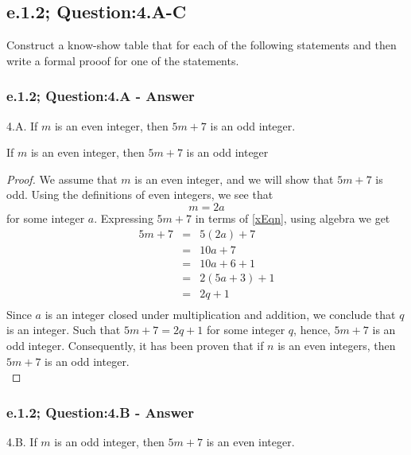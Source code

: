 \subsection{e.1.2; Question:4.A-C}
Construct a know-show table that for each of the following statements and then write a formal prooof for one of the statements. \\

\subsubsection*{e.1.2; Question:4.A - Answer}
4.A. If $m$ is an even integer, then $5m + 7$ is an odd integer. \\

\begin{tcolorbox}
\begin{theorem}
If $m$ is an even integer, then $5m + 7$ is an odd integer
\end{theorem}
\end{tcolorbox}

\begin{proof}
We assume that $m$ is an even integer, and we will show that $5m + 7$ is odd. Using the definitions of even integers, we see that
\begin{equation}
\label{xEqn}
m = 2a
\end{equation}
for some integer $a$. Expressing $5m + 7$ in terms of \ref{xEqn}, using algebra we get
\begin{eqnarray*}
5m + 7 & = & 5(2a) + 7  \nonumber \\
& = & 10a + 7 \nonumber \\
& = & 10a + 6 + 1 \nonumber \\
& = & 2(5a + 3) + 1 \nonumber \\
& = & 2q + 1 \nonumber \\
\end{eqnarray*}
Since $a$ is an integer closed under multiplication and addition, we conclude that $q$ is an integer. Such that $5m + 7 = 2q + 1$ for some integer $q$, hence, $5m + 7$ is an odd integer. Consequently, it has been proven that if $n$ is an even integers, then $5m + 7$ is an odd integer. \\
\end{proof}


\subsubsection*{e.1.2; Question:4.B - Answer} 
4.B. If $m$ is an odd integer, then $5m + 7$ is an even integer. \\

